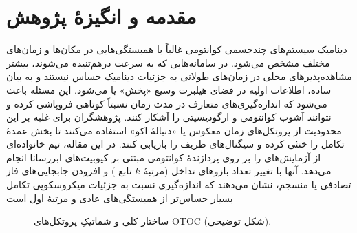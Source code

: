


\section{مقدمه و انگیزهٔ پژوهش}

دینامیک سیستم‌های چندجسمی کوانتومی غالباً با همبستگی‌هایی در مکان‌ها و زمان‌های مختلف مشخص می‌شود. در سامانه‌هایی که به سرعت درهم‌تنیده می‌شوند، بیشتر مشاهده‌پذیرهای محلی در زمان‌های طولانی به جزئیات دینامیک حساس نیستند و به بیان ساده، اطلاعات اولیه در فضای هیلبرت وسیع «پخش» یا  می‌شود. این مسئله باعث می‌شود که اندازه‌گیری‌های متعارف در مدت زمان نسبتاً کوتاهی فروپاشی کرده و نتوانند آشوب کوانتومی و ارگودیسیتی را آشکار کنند.  پژوهشگران برای غلبه بر این محدودیت از پروتکل‌های زمان-معکوس یا «دنبالهٔ اکو» استفاده می‌کنند تا بخش عمدهٔ تکامل را خنثی کرده و سیگنال‌های ظریف را بازیابی کنند.
در این مقاله، تیم  خانواده‌ای از آزمایش‌های  را بر روی پردازندهٔ کوانتومی مبتنی بر کیوبیت‌های ابررسانا انجام می‌دهد. آنها با تغییر تعداد بازوهای تداخل (مرتبهٔ \(k\) تابع ) و افزودن جابجایی‌های فاز تصادفی یا منسجم، نشان می‌دهند که اندازه‌گیری  نسبت به جزئیات میکروسکوپی تکامل بسیار حساس‌تر از همبستگی‌های عادی و مرتبهٔ اول است

\begin{figure}[htbp]
  \centering
  \caption{ساختار کلی و شماتیکِ پروتکل‌های OTOC (شکل توضیحی). }
  \label{fig:otoc-protocol}
\end{figure}

